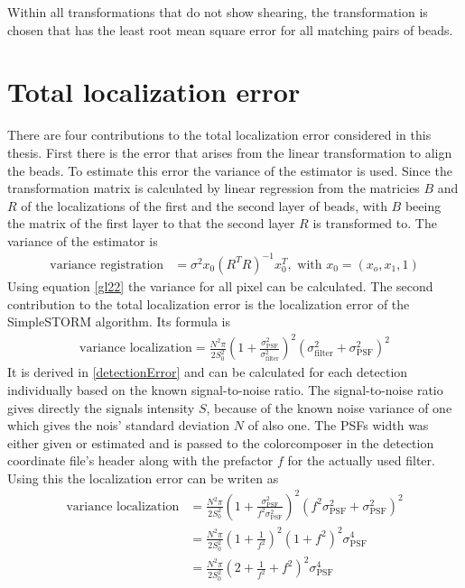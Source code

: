 Within all transformations that do not show shearing, the transformation is chosen that has the least root mean square error for all matching pairs of beads.

\section{Total localization error}
There are four contributions to the total localization error considered in this thesis.\newline
First there is the error that arises from the linear transformation to align the beads. To estimate this error the variance of the estimator is used. Since the transformation matrix is calculated by linear regression from the matricies $B$ and $R$ of the localizations of the first and the second layer of beads, with $B$ beeing the matrix of the first layer to that the second layer $R$ is transformed to. The variance of the estimator is
\begin{align}
\text{variance registration}&= \sigma^2 x_0\left(R^TR\right)^{-1}x_0^T, \text{ with }x_0 = \left(x_o,x_1,1\right) \label{gl22}
\end{align}
Using equation \ref{gl22} the variance for all pixel can be calculated.\newline
The second contribution to the total localization error is the localization error of the SimpleSTORM algorithm. Its formula is
\begin{align}
 \text{variance localization} = \frac{N^2\pi}{2S_0^2} \left(1+\frac{\sigma_\text{PSF}^2}{\sigma_\text{filter}^2}\right)^2\left(\sigma_\text{filter}^2+\sigma_\text{PSF}^2\right)^2
\end{align}
It is derived in \ref{detectionError} and can be calculated for each detection individually based on the known signal-to-noise ratio. The signal-to-noise ratio gives directly the signals intensity $S$, because of the known noise variance of one which gives the nois' standard deviation $N$ of also one. The PSFs width was either given or estimated and is passed to the colorcomposer in the detection coordinate file's header along with the prefactor $f$ for the actually used filter. Using this the localization error can be writen as
\begin{align}
 \text{variance localization} &= \frac{N^2\pi}{2S_0^2} \left(1+\frac{\sigma_\text{PSF}^2}{f^2\sigma_\text{PSF}^2}\right)^2\left(f^2\sigma_\text{PSF}^2+\sigma_\text{PSF}^2\right)^2 \\
 &=\frac{N^2\pi}{2S_0^2}\left(1+\frac{1}{f^2}\right)^2\left(1+f^2\right)^2\sigma_\text{PSF}^4\\
 &= \frac{N^2\pi}{2S_0^2}\left(2+\frac{1}{f^2}+f^2\right)^2\sigma_\text{PSF}^4
\end{align}
